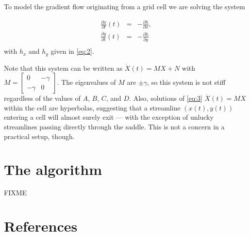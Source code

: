 \documentclass{amsart}
\begin{document}
To model the gradient flow originating from a grid cell we are solving the system

\begin{eqnarray}
  \label{eq:3}
  \frac{\partial x}{\partial t}(t) &=& -\frac{\partial h}{\partial x},\\
  \frac{\partial y}{\partial t}(t) &=& -\frac{\partial h}{\partial y}\\
\end{eqnarray}
with $h_{x}$ and $h_{y}$ given in \eqref{eq:2}.

Note that this system can be written as $\dot X(t) = MX + N$ with
$M =
\left[\begin{matrix}
  0 & -\gamma\\
-\gamma & 0
\end{matrix}\right]$.
The eigenvalues of $M$ are $\pm \gamma$, so this system is not stiff regardless
of the values of $A$, $B$, $C$, and $D$. Also, solutions of \eqref{eq:3} $\dot
X(t) = MX$ within the cell are hyperbolas, suggesting that a streamline $(x(t),
y(t))$ entering a cell will almost surely exit --- with the exception of
unlucky streamlines passing directly through the saddle. This is not a concern
in a practical setup, though.

\section{The algorithm}
\label{sec:algorithm}

FIXME

\section{References}
\label{sec:references}



\end{document}
